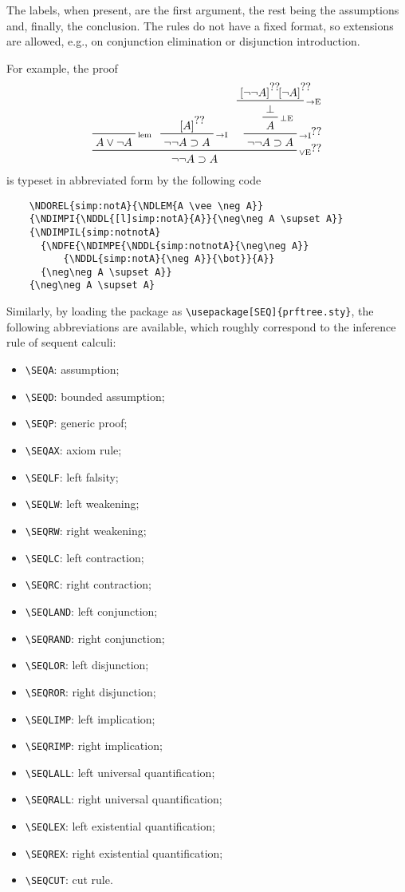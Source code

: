 \documentclass{amsart}
\begin{document}
The labels, when present, are the first argument, the rest being the
assumptions and, finally, the conclusion. The rules do not have a
fixed format, so extensions are allowed, e.g., on conjunction
elimination or disjunction introduction.

For example, the proof
\begin{displaymath}
  \begin{prfenv}
    \NDOREL{simp:notA}{\NDLEM{A \vee \neg A}}
    {\NDIMPI{\NDDL{[l]simp:notA}{A}}{\neg\neg A \supset A}}
    {\NDIMPIL{simp:notnotA}
      {\NDFE{\NDIMPE{\NDDL{simp:notnotA}{\neg\neg A}}
          {\NDDL{simp:notA}{\neg A}}{\bot}}{A}} 
      {\neg\neg A \supset A}}
    {\neg\neg A \supset A}
  \end{prfenv}
\end{displaymath}
is typeset in abbreviated form by the following code
\begin{verbatim}
    \NDOREL{simp:notA}{\NDLEM{A \vee \neg A}}
    {\NDIMPI{\NDDL{[l]simp:notA}{A}}{\neg\neg A \supset A}}
    {\NDIMPIL{simp:notnotA}
      {\NDFE{\NDIMPE{\NDDL{simp:notnotA}{\neg\neg A}}
          {\NDDL{simp:notA}{\neg A}}{\bot}}{A}} 
      {\neg\neg A \supset A}}
    {\neg\neg A \supset A}
\end{verbatim}\vspace{2ex}

Similarly, by loading the package as
\verb|\usepackage[SEQ]{prftree.sty}|, the following abbreviations
are available, which roughly correspond to the inference rule of
sequent calculi:
\begin{itemize}
\item \verb|\SEQA|: assumption;
\item \verb|\SEQD|: bounded assumption;
\item \verb|\SEQP|: generic proof;
\item \verb|\SEQAX|: axiom rule;
\item \verb|\SEQLF|: left falsity;
\item \verb|\SEQLW|: left weakening;
\item \verb|\SEQRW|: right weakening;
\item \verb|\SEQLC|: left contraction;
\item \verb|\SEQRC|: right contraction;
\item \verb|\SEQLAND|: left conjunction;
\item \verb|\SEQRAND|: right conjunction;
\item \verb|\SEQLOR|: left disjunction;
\item \verb|\SEQROR|: right disjunction;
\item \verb|\SEQLIMP|: left implication;
\item \verb|\SEQRIMP|: right implication;
\item \verb|\SEQLALL|: left universal quantification;
\item \verb|\SEQRALL|: right universal quantification;
\item \verb|\SEQLEX|:  left existential quantification;
\item \verb|\SEQREX|: right existential quantification;
\item \verb|\SEQCUT|: cut rule.
\end{itemize}
\end{document}

